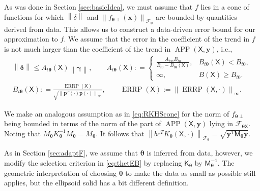 \documentclass[]{mcom-l}
\theoremstyle{theorem}
\theoremstyle{remark}
\DeclareMathOperator{\errP}{ERRP}
\DeclareMathOperator{\APP}{APP}
\newcommand{\mK}{\mathsf{K}}
\newcommand{\mM}{\mathsf{M}}
\newcommand{\mX}{\mathsf{X}}
\newcommand{\bx}{{\boldsymbol{x}}}
\newcommand{\bp}{{\boldsymbol{p}}}
\newcommand{\by}{{\boldsymbol{y}}}
\newcommand{\bgamma}{{\boldsymbol{\gamma}}}
\newcommand{\bdelta}{{\boldsymbol{\delta}}}
\newcommand{\btheta}{{\boldsymbol{\theta}}}
\newcommand{\calf}{{\mathcal{F}}}
\newcommand{\norm}[2][{}]{\ensuremath{\left \lVert #2 \right \rVert}_{#1}}
\begin{document}
As was done in Section \ref{sec:basicIdea}, we must assume that $f$ lies in a cone of functions for which $\norm{\delta}$ and $\norm[\calf_\btheta]{f_{\btheta\perp}(\bx)}$ are bounded by quantities derived from data.  This allows us to  construct a data-driven error bound for our approximation to $f$.  We assume that the error in the coefficient of the trend in $f$ is not much larger than the  coefficient of the trend in $\APP(\mX,\by)$, i.e., 
\begin{gather*}
\norm{\bdelta} \le A_{t\btheta}(\mX) \norm{\bgamma}, \qquad A_{t\btheta}(\mX): = \begin{cases} \displaystyle
\frac{A_{t\infty} B_{t0}}{B_{t0} - B_{t \btheta}(\mX)}, & B_{t \btheta}(\mX) < B_{t0}, \\
\infty, & B(\mX) \ge B_{t0}.
\end{cases}\\
B_{t\btheta}(\mX) : =   \frac{\errP(\mX)}{\sqrt{\norm[\infty]{\bp^T(\cdot)\bp(\cdot)}}}, \qquad \errP(\mX) := \norm[\infty]{\errP(\mX,\cdot)}.
\end{gather*} 

We make an analogous assumption as in \eqref{eq:RKHScone} for the norm of $f_{\btheta \perp}$ being bounded in terms of the norm of the part of $\APP(\mX,\by)$ lying in $\calf_{\btheta \mX}$.  Noting that $M_\btheta K_\btheta^{-1} M_\btheta = M_\btheta$.  It follows that $\norm[\calf_{\btheta}]{bc^T K_\btheta(\mX,\cdot)} = \sqrt{\by^T \mM_\btheta \by}$.

As in Section \ref{sec:adaptF}, we assume that $\btheta$ is inferred from data, however, we modify the selection criterion in \eqref{eq:thetEB} by replacing $\mK_\btheta$ by $\mM_{\btheta}^{-1}$.  The geometric interpretation of choosing $\btheta$ to make the data as small as possible still applies, but the ellipsoid solid has a bit different definition.
\end{document}
